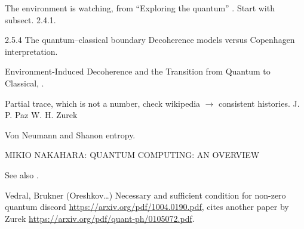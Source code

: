 The environment is watching, from ``Exploring the quantum''
\parencite[Ch. 4]{Haroche_Exploring}. Start with subsect. 2.4.1.

2.5.4 The quantum–classical boundary
Decoherence models versus Copenhagen interpretation.

Environment-Induced Decoherence and the Transition from Quantum to Classical,
\cite{Zurek_Fundamentals}.

Partial trace, which is not a number, check wikipedia $\rightarrow$ consistent histories.
J. P. Paz W. H. Zurek

Von Neumann and Shanon entropy.

MIKIO NAKAHARA: QUANTUM COMPUTING: AN OVERVIEW

See also \cite{Schlosshauer_Decoherence}.

Vedral, Brukner (Oreshkov\dots)
Necessary and sufficient condition for non-zero quantum discord
\url{https://arxiv.org/pdf/1004.0190.pdf},
cites another paper by Zurek \url{https://arxiv.org/pdf/quant-ph/0105072.pdf}.
